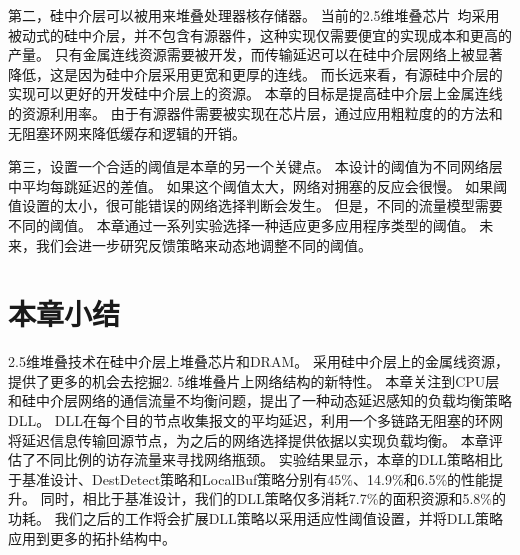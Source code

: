 第二，硅中介层可以被用来堆叠处理器核存储器。
当前的2.5维堆叠芯片~均采用被动式的硅中介层，并不包含有源器件，这种实现仅需要便宜的实现成本和更高的产量。
只有金属连线资源需要被开发，而传输延迟可以在硅中介层网络上被显著降低，这是因为硅中介层采用更宽和更厚的连线。
而长远来看，有源硅中介层的实现可以更好的开发硅中介层上的资源。
本章的目标是提高硅中介层上金属连线的资源利用率。
由于有源器件需要被实现在芯片层，通过应用粗粒度的的方法和无阻塞环网来降低缓存和逻辑的开销。

第三，设置一个合适的阈值是本章的另一个关键点。
本设计的阈值为不同网络层中平均每跳延迟的差值。
如果这个阈值太大，网络对拥塞的反应会很慢。
如果阈值设置的太小，很可能错误的网络选择判断会发生。
但是，不同的流量模型需要不同的阈值。
本章通过一系列实验选择一种适应更多应用程序类型的阈值。
未来，我们会进一步研究反馈策略来动态地调整不同的阈值。



\section{本章小结}
\label{sec:dllconclusion}
2.5维堆叠技术在硅中介层上堆叠芯片和DRAM。
采用硅中介层上的金属线资源，提供了更多的机会去挖掘2. 5维堆叠片上网络结构的新特性。
本章关注到CPU层和硅中介层网络的通信流量不均衡问题，提出了一种动态延迟感知的负载均衡策略DLL。
DLL在每个目的节点收集报文的平均延迟，利用一个多链路无阻塞的环网将延迟信息传输回源节点，为之后的网络选择提供依据以实现负载均衡。
本章评估了不同比例的访存流量来寻找网络瓶颈。
实验结果显示，本章的DLL策略相比于基准设计、DestDetect策略和LocalBuf策略分别有45\%、14.9\%和6.5\%的性能提升。
同时，相比于基准设计，我们的DLL策略仅多消耗7.7\%的面积资源和5.8\%的功耗。
我们之后的工作将会扩展DLL策略以采用适应性阈值设置，并将DLL策略应用到更多的拓扑结构中。